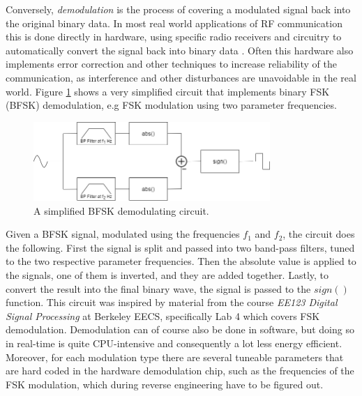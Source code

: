 Conversely, \textit{demodulation} is the process of covering a modulated signal back into the original binary data. In most real world applications of RF communication this is done directly in hardware, using specific radio receivers and circuitry to automatically convert the signal back into binary data \cite{rf-modulation}. Often this hardware also implements error correction and other techniques to increase reliability of the communication, as interference and other disturbances are unavoidable in the real world. Figure \ref{fig:bfsk-demodulator} shows a very simplified circuit that implements binary FSK (BFSK) demodulation, e.g FSK modulation using two parameter frequencies.
\begin{figure}[!ht]
    \centering
    \includegraphics[width=0.8\textwidth]{images/6-pentesting/bfsk-demodulator.png}
    \caption{A simplified BFSK demodulating circuit.}
    \label{fig:bfsk-demodulator}
\end{figure}
Given a BFSK signal, modulated using the frequencies $f_1$ and $f_2$, the circuit does the following. First the signal is split and passed into two band-pass filters, tuned to the two respective parameter frequencies. Then the absolute value is applied to the signals, one of them is inverted, and they are added together. Lastly, to convert the result into the final binary wave, the signal is passed to the $sign()$ function. This circuit was inspired by material from the course \textit{EE123 Digital Signal Processing} at Berkeley EECS, specifically Lab 4 which covers FSK demodulation. Demodulation can of course also be done in software, but doing so in real-time is quite CPU-intensive and consequently a lot less energy efficient. Moreover, for each modulation type there are several tuneable parameters that are hard coded in the hardware demodulation chip, such as the frequencies of the FSK modulation, which during reverse engineering have to be figured out.

